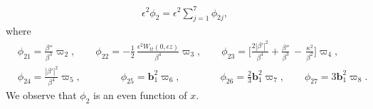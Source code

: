 \documentclass[10pt, reqno]{amsart}
\numberwithin{equation}{section}
\theoremstyle{definition}
\begin{document}
{{\begin{align}\label{definition of e2phi2}
\epsilon^2\phi_2 = \epsilon^2\sum_{j=1}^{7}\phi_{2j},
\end{align}
where
\begin{align}\label{phi21-phi210}
& \phi_{21} = \frac{\beta''} {\beta^3}\varpi_2,
\qquad
\phi_{22} =- \frac{1}{2}\, \frac{\epsilon^2W_{tt}(0, \epsilon z)}{\beta^4}\varpi_3,
\qquad
\phi_{23} = \Big[\frac{2|\beta'|^2}{\beta^4}
+\frac{\beta''} {\beta^3}\,-\,\frac{\kappa^2}{\beta^2}\Big]\varpi_4,
\nonumber\\[2mm]
&
\phi_{24} = \frac{|\beta'|^2}{\beta^4} \varpi_5,
\qquad \qquad
\phi_{25} = {\mathbf b}_1^2\varpi_6,
\qquad \qquad
\phi_{26} =\frac23 {\mathbf b}_1^2\varpi_7,
\qquad
\phi_{27} = 3 {\mathbf b}_1^2\varpi_{8}.
\end{align}
We observe that $\phi_2$ is an even function of $x$.






}}
\end{document}
